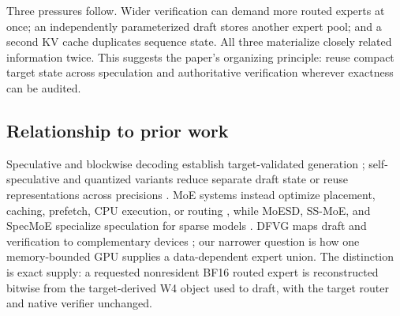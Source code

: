 Three pressures follow. Wider verification can demand more routed experts at once;
an independently parameterized draft stores another expert pool; and a second KV
cache duplicates sequence state. All three materialize closely related information
twice. This suggests the paper's organizing principle: reuse compact target state
across speculation and authoritative verification wherever exactness can be audited.

\subsection{Relationship to prior work}

Speculative and blockwise decoding establish target-validated generation
\cite{stern2018blockwise,leviathan2023fast}; self-speculative and quantized variants
reduce separate draft state or reuse representations across precisions
\cite{zhang2024draftverify,elhoushi2024layerskip,zhao2025qspec,wang2025subspec}.
MoE systems instead optimize placement, caching, prefetch, CPU execution, or routing
\cite{sheng2023flexgen,xue2024moeinfinity,du2024sida,kong2024swapmoe,hwang2024pregated},
while MoESD, SS-MoE, and SpecMoE specialize speculation for sparse models
\cite{huang2025moesd,zheng2026ssmoe,bang2026specmoe}. DFVG maps draft and verification
to complementary devices \cite{lu2026dfvg}; our narrower question is how one
memory-bounded GPU supplies a data-dependent expert union. The distinction is exact
supply: a requested nonresident BF16 routed expert is reconstructed bitwise from the
target-derived W4 object used to draft, with the target router and native verifier
unchanged.

